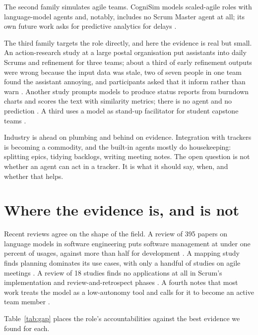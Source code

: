 \documentclass[conference]{IEEEtran}
\begin{document}
The second family simulates agile teams. CogniSim models scaled-agile roles with language-model agents and, notably, includes no Scrum Master agent at all; its own future work asks for predictive analytics for delays \cite{cognisim}.

The third family targets the role directly, and here the evidence is real but small. An action-research study at a large postal organisation put assistants into daily Scrums and refinement for three teams; about a third of early refinement outputs were wrong because the input data was stale, two of seven people in one team found the assistant annoying, and participants asked that it inform rather than warn \cite{cabrero}. Another study prompts models to produce status reports from burndown charts and scores the text with similarity metrics; there is no agent and no prediction \cite{alliata}. A third uses a model as stand-up facilitator for student capstone teams \cite{couder}.

Industry is ahead on plumbing and behind on evidence. Integration with trackers is becoming a commodity, and the built-in agents mostly do housekeeping: splitting epics, tidying backlogs, writing meeting notes. The open question is not whether an agent can act in a tracker. It is what it should say, when, and whether that helps.

\section{Where the evidence is, and is not}
\label{sec:gap}

Recent reviews agree on the shape of the field. A review of 395 papers on language models in software engineering puts software management at under one percent of usages, against more than half for development \cite{hou}. A mapping study finds planning dominates its use cases, with only a handful of studies on agile meetings \cite{planotscher}. A review of 18 studies finds no applications at all in Scrum's implementation and review-and-retrospect phases \cite{peras}. A fourth notes that most work treats the model as a low-autonomy tool and calls for it to become an active team member \cite{kwok}.

Table~\ref{tab:gap} places the role's accountabilities against the best evidence we found for each.
\end{document}
